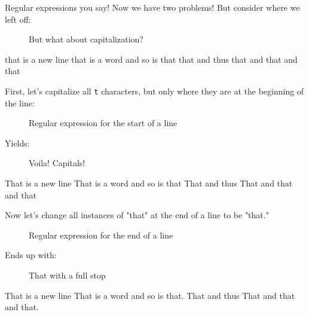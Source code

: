 \documentclass[10pt,american,]{book}
\newenvironment{Shaded}{\begin{snugshade}}{\end{snugshade}}
\newcommand{\KeywordTok}[1]{\textcolor[rgb]{0.13,0.29,0.53}{\textbf{{#1}}}}
\newcommand{\OtherTok}[1]{\textcolor[rgb]{0.56,0.35,0.01}{{#1}}}
\newcommand{\NormalTok}[1]{{#1}}
\numberwithin{figure}{chapter}
\DeclareRobustCommand{\drcap}[1]{\begin{figure}[H]\caption{#1}\end{figure}}
\renewcommand{\KeywordTok}[1]{{#1}}
\renewcommand{\OtherTok}[1]{{#1}}
\renewcommand{\NormalTok}[1]{{#1}}
\begin{document}
Regular expressions you say! Now we have two problems! But consider
where we left off:

\drcap{But what about capitalization?}

\begin{Shaded}
\begin{Highlighting}[]
\KeywordTok{that} \NormalTok{is a new line}
\KeywordTok{that} \NormalTok{is a word}
\KeywordTok{and} \NormalTok{so is that}
\KeywordTok{that} \NormalTok{and thus}
\KeywordTok{that} \NormalTok{and that and that}
\end{Highlighting}
\end{Shaded}

First, let's capitalize all \texttt{t} characters, but only where they
are at the beginning of the line:

\drcap{Regular expression for the start of a line}

\begin{Shaded}
\end{Shaded}

Yields:

\drcap{Voila! Capitals!}

\begin{Shaded}
\begin{Highlighting}[]
\KeywordTok{That} \NormalTok{is a new line}
\KeywordTok{That} \NormalTok{is a word}
\KeywordTok{and} \NormalTok{so is that}
\KeywordTok{That} \NormalTok{and thus}
\KeywordTok{That} \NormalTok{and that and that}
\end{Highlighting}
\end{Shaded}

Now let's change all instances of "that" at the end of a line to be
"that."

\drcap{Regular expression for the end of a line}

\begin{Shaded}
\end{Shaded}

Ends up with:

\drcap{That with a full stop}

\begin{Shaded}
\begin{Highlighting}[]
\KeywordTok{That} \NormalTok{is a new line}
\KeywordTok{That} \NormalTok{is a word}
\KeywordTok{and} \NormalTok{so is that.}
\KeywordTok{That} \NormalTok{and thus}
\KeywordTok{That} \NormalTok{and that and that.}
\end{Highlighting}
\end{Shaded}
\end{document}
